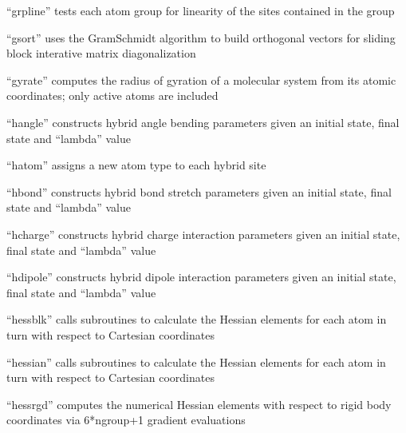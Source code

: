 \documentclass[letterpaper,11pt,english]{sphinxmanual}
\begin{document}

“grpline” tests each atom group for linearity of the sites
contained in the group


“gsort” uses the Gram\sphinxhyphen{}Schmidt algorithm to build orthogonal
vectors for sliding block interative matrix diagonalization


“gyrate” computes the radius of gyration of a molecular system
from its atomic coordinates; only active atoms are included


“hangle” constructs hybrid angle bending parameters given
an initial state, final state and “lambda” value


“hatom” assigns a new atom type to each hybrid site


“hbond” constructs hybrid bond stretch parameters given
an initial state, final state and “lambda” value


“hcharge” constructs hybrid charge interaction parameters
given an initial state, final state and “lambda” value


“hdipole” constructs hybrid dipole interaction parameters
given an initial state, final state and “lambda” value


“hessblk” calls subroutines to calculate the Hessian elements
for each atom in turn with respect to Cartesian coordinates


“hessian” calls subroutines to calculate the Hessian elements
for each atom in turn with respect to Cartesian coordinates


“hessrgd” computes the numerical Hessian elements with
respect to rigid body coordinates via 6*ngroup+1 gradient
evaluations

\end{document}
